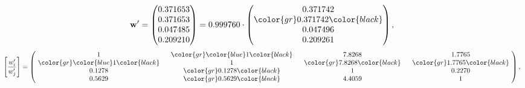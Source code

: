 \begin{example}
\begin{equation*}
\mathbf{w}^{\prime} =
\begin{pmatrix}
0.371653\\
0.371653\\
0.047485\\
0.209210
\end{pmatrix} =
0.999760\cdot
\begin{pmatrix}
0.371742\\
\color{gr} 0.371742\color{black} \\
0.047496\\
0.209261
\end{pmatrix},
\end{equation*}
\begin{equation*}
\left[ \frac{{w}^{\prime}_i}{{w}^{\prime}_j} \right] =
\begin{pmatrix}
$\,\,$ 1 $\,\,$ & $\,\,$\color{gr} \color{blue} 1\color{black} $\,\,$ & $\,\,$7.8268$\,\,$ & $\,\,$1.7765$\,\,$ \\
$\,\,$\color{gr} \color{blue} 1\color{black} $\,\,$ & $\,\,$ 1 $\,\,$ & $\,\,$\color{gr} 7.8268\color{black} $\,\,$ & $\,\,$\color{gr} 1.7765\color{black}   $\,\,$ \\
$\,\,$0.1278$\,\,$ & $\,\,$\color{gr} 0.1278\color{black} $\,\,$ & $\,\,$ 1 $\,\,$ & $\,\,$0.2270 $\,\,$ \\
$\,\,$0.5629$\,\,$ & $\,\,$\color{gr} 0.5629\color{black} $\,\,$ & $\,\,$4.4059$\,\,$ & $\,\,$ 1  $\,\,$ \\
\end{pmatrix},
\end{equation*}
\end{example}
\newpage

